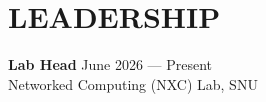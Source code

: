 \section*{LEADERSHIP}

\noindent
\textbf{Lab Head} \hfill June 2026 --- Present \\
Networked Computing (NXC) Lab, SNU \\

